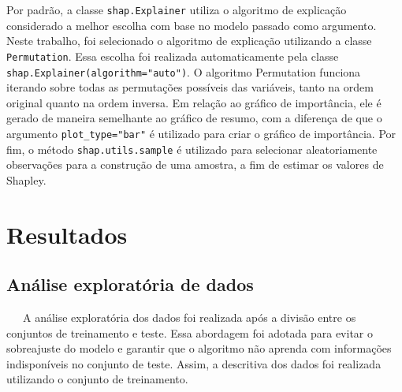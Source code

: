 \documentclass[
  12pt,
  a4paper,
]{scrreprt}
\begin{document}
Por padrão, a classe \texttt{shap.Explainer} utiliza o algoritmo de
explicação considerado a melhor escolha com base no modelo passado como
argumento. Neste trabalho, foi selecionado o algoritmo de explicação
utilizando a classe \texttt{Permutation}. Essa escolha foi realizada
automaticamente pela classe \texttt{shap.Explainer(algorithm="auto")}. O
algoritmo Permutation funciona iterando sobre todas as permutações
possíveis das variáveis, tanto na ordem original quanto na ordem
inversa. Em relação ao gráfico de importância, ele é gerado de maneira
semelhante ao gráfico de resumo, com a diferença de que o argumento
\texttt{plot\_type="bar"} é utilizado para criar o gráfico de
importância. Por fim, o método \texttt{shap.utils.sample} é utilizado
para selecionar aleatoriamente observações para a construção de uma
amostra, a fim de estimar os valores de Shapley.

\chapter{Resultados}\label{resultados}

\section{Análise exploratória de
dados}\label{anuxe1lise-exploratuxf3ria-de-dados-1}

~~~A análise exploratória dos dados foi realizada após a divisão entre
os conjuntos de treinamento e teste. Essa abordagem foi adotada para
evitar o sobreajuste do modelo e garantir que o algoritmo não aprenda
com informações indisponíveis no conjunto de teste. Assim, a descritiva
dos dados foi realizada utilizando o conjunto de treinamento.
\end{document}
